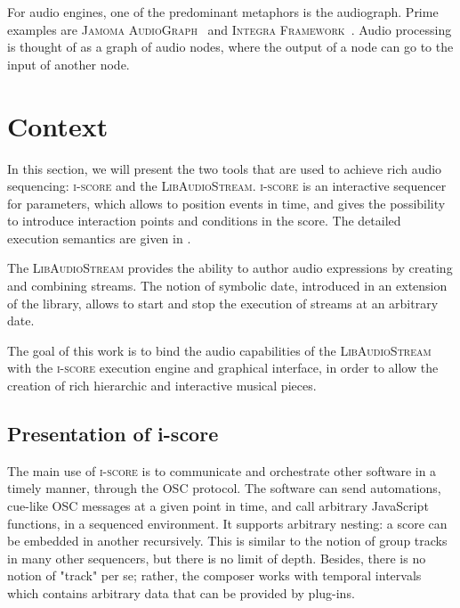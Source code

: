 \documentclass{article}
\newcommand*{\LibAudioStream}{\textsc{LibAudioStream}\xspace}
\newcommand*{\iscore}{\textsc{i-score}\xspace}
\newcommand*{\jamomaaudiograph}{\textsc{Jamoma AudioGraph}\xspace}
\newcommand*{\integraframework}{\textsc{Integra Framework}\xspace}
\begin{document}
For audio engines, one of the predominant metaphors is the audiograph.
Prime examples are \jamomaaudiograph~\cite{place2010jamoma} and \integraframework~\cite{bullock2011integra}.
Audio processing is thought of as a graph of audio nodes, where the output of a node can go to the input of another node.

\section{Context}
In this section, we will present the two tools that are used to achieve 
rich audio sequencing: \iscore and the \LibAudioStream.
\iscore is an interactive sequencer for parameters, which allows to position events 
in time, and gives the possibility to introduce interaction points and 
conditions in the score.
The detailed execution semantics are given in \cite{celerier2015ossia}.

The \LibAudioStream\cite{letzlibaudiostream} provides the ability to author audio expressions
by creating and combining streams. The notion of symbolic date, introduced in an extension of the library,
allows to start and stop the execution of streams at an arbitrary date.

The goal of this work is to bind the audio capabilities of the \LibAudioStream 
with the \iscore execution engine and graphical interface, in order to allow 
the creation of rich hierarchic and interactive musical pieces.

\subsection{Presentation of i-score}
The main use of \iscore is to communicate and orchestrate other software in a timely manner, 
through the OSC protocol.
The software can send automations, cue-like OSC messages at a given point in time, and call arbitrary JavaScript functions, in a sequenced environment.
It supports arbitrary nesting: a score can be embedded in another recursively.
This is similar to the notion of group tracks in many other sequencers, but 
there is no limit of depth. 
Besides, there is no notion of "track" per se; rather, the composer works with 
temporal intervals which contains arbitrary data that can be provided by plug-ins.
\end{document}
